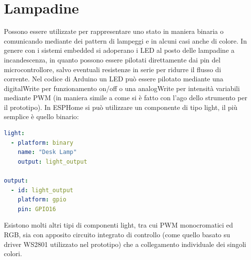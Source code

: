 \documentclass[12pt,a4paper]{report}
\begin{document}
\section{Lampadine}
Possono essere utilizzate per rappresentare uno stato in maniera binaria o comunicando mediante dei pattern di lampeggi e in alcuni
casi anche di colore.
In genere con i sistemi embedded si adoperano i LED al posto delle lampadine a incandescenza, in quanto possono essere pilotati
direttamente dai pin del microcontrollore, salvo eventuali resistenze in serie per ridurre il flusso di corrente.
Nel codice di Arduino un LED può essere pilotato mediante una digitalWrite per funzionamento on/off o una analogWrite per
intensità variabili mediante PWM (in maniera simile a come si è fatto con l'ago dello strumento per il prototipo).
In ESPHome si può utilizzare un componente di tipo light, il più semplice è quello binario\cite{esphomeio}:
\begin{lstlisting}[language=yaml]
light:
  - platform: binary
    name: "Desk Lamp"
    output: light_output

output:
  - id: light_output
    platform: gpio
    pin: GPIO16
\end{lstlisting}

Esistono molti altri tipi di componenti light, tra cui PWM monocromatici ed RGB, sia con apposito circuito integrato di controllo (come
quello basato su driver WS2801 utilizzato nel prototipo) che a collegamento individuale dei singoli colori.
\end{document}
